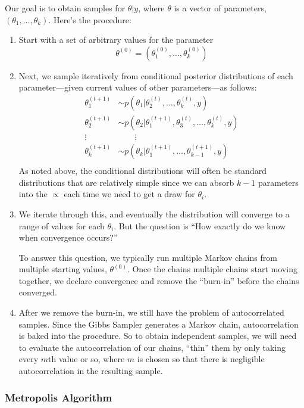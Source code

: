 \documentclass[12pt]{article}
\theoremstyle{plain}
\theoremstyle{definition}
\theoremstyle{remark}
\begin{document}
Our goal is to obtain samples for $\theta | y$, where $\theta$
is a vector of parameters, $(\theta_1, \ldots, \theta_k)$. Here's
the procedure:
\begin{enumerate}
   \item Start with a set of arbitrary values for the parameter
      \[ \theta^{(0)} = (\theta_1^{(0)}, \ldots,  \theta_k^{(0)}) \]
   \item Next, we sample iteratively from conditional posterior
      distributions of each parameter---given current values of
      other parameters---as follows:
      \begin{align*}
	 \theta_1^{(t+1)} &\sim p(\theta_1 |
	    \theta_2^{(t)}, \ldots,  \theta_k^{(t)}, y)\\
	 \theta_2^{(t+1)} &\sim p(\theta_2 |
	    \theta_1^{(t+1)},\theta_3^{(t)},\ldots,\theta_k^{(t)}, y)\\
	 \vdots \quad & \qquad \vdots \\
	 \theta_k^{(t+1)} &\sim p(\theta_k |
	    \theta_1^{(t+1)},\ldots, \theta_{k-1}^{(t+1)}, y)\\
      \end{align*}
      As noted above, the conditional distributions will often be
      standard distributions that are relatively simple since we
      can absorb $k-1$ parameters into the $\propto$ each time
      we need to get a draw for $\theta_i$.
   \item We iterate through this, and eventually the distribution will
      converge to a range of values for each $\theta_i$. But
      the question is ``How exactly do we know when convergence
      occurs?''

      To answer this question, we typically run multiple
      Markov chains from multiple starting values, $\theta^{(0)}$.
      Once the chains multiple chains start moving together, we declare
      convergence and remove the ``burn-in'' before the chains
      converged.
   \item After we remove the burn-in, we still have the problem of
      autocorrelated samples.  Since the Gibbs Sampler generates
      a Markov chain, autocorrelation is baked into the procedure.
      So to obtain independent samples, we will need to evaluate the
      autocorrelation of our chains, ``thin'' them by only taking
      every $m$th value or so, where $m$ is chosen so that
      there is negligible autocorrelation in the resulting sample.
\end{enumerate}

\newpage
\subsubsection{Metropolis Algorithm}
\end{document}
